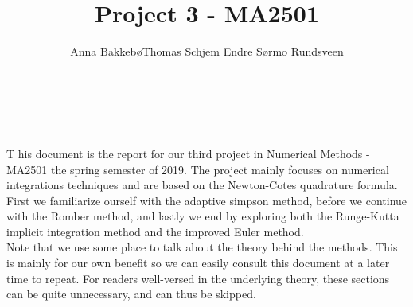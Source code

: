 \documentclass[12pt, a4paper,usenames,dvipsnames]{article}
\title{Project 3 - MA2501}
\author{Anna Bakkebø\And Thomas Schjem \And Endre Sørmo Rundsveen}
\begin{document}
\begin{titlepage}
  
    {\noindent \Huge {}}\\
    
    {\noindent\large \color{Brown}{Anna Bakkebø\\Thomas Schjem\\Endre Sørmo Rundsveen}}\\
    \raggedright
    \hfill \break
    \lettrine[lraise=0.15]{T}{} his document is the report for our third project in Numerical Methods - MA2501 the spring semester of 2019. The project mainly focuses on numerical integrations techniques and are based on the Newton-Cotes quadrature formula. First we familiarize ourself with the adaptive simpson method, before we continue with the Romber method, and lastly we end by exploring both the Runge-Kutta implicit integration method and the improved Euler method. \\ 
    \hspace{10pt}Note that we use some place to talk about the theory behind the methods. This is mainly for our own benefit so we can easily consult this document at a later time to repeat. For readers well-versed in the underlying theory, these sections can be quite unnecessary, and can thus be skipped. 
\end{titlepage}
\restoregeometry
\end{document}
